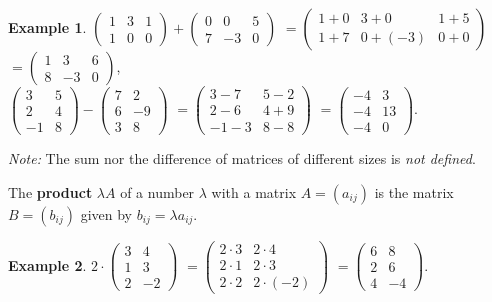 \documentclass[
  english,
  12pt,
  oneside]{book}
\theoremstyle{definition}
\theoremstyle{definition}
\newtheorem{example}{Example}[chapter]
\theoremstyle{definition}
\theoremstyle{definition}
\theoremstyle{remark}
\begin{document}
\begin{example}
\protect\hypertarget{exm:unnamed-chunk-43}{}\label{exm:unnamed-chunk-43}\(\begin{pmatrix}1 & 3 & 1\\ 1 & 0 & 0\end{pmatrix}+
\begin{pmatrix}0 & 0 & 5\\ 7 & -3 & 0\end{pmatrix}\)
\(=\begin{pmatrix}1+0&3+0&1+5\\1+7&0+(-3)&0+0\end{pmatrix}\)
\(=\begin{pmatrix}1&3&6\\8&-3&0\end{pmatrix}\),\\
\(\begin{pmatrix}3&5\\2&4\\-1&8\end{pmatrix}-\begin{pmatrix}7&2\\6&-9\\3&8\end{pmatrix}\)
\(=\begin{pmatrix}3-7&5-2\\2-6&4+9\\-1-3& 8-8\end{pmatrix}\)
\(=\begin{pmatrix}-4&3\\-4&13\\-4&0\end{pmatrix}\).
\end{example}

\emph{Note:} The sum nor the difference of matrices of different sizes is \emph{not defined}.

The \textbf{product} \(\lambda A\) of a number \(\lambda\) with a matrix \(A=(a_{ij})\) is the matrix \(B=(b_{ij})\) given by \(b_{ij}=\lambda a_{ij}\).

\begin{example}
\protect\hypertarget{exm:unnamed-chunk-44}{}\label{exm:unnamed-chunk-44}\(2\cdot \begin{pmatrix} 3 & 4\\ 1 & 3\\ 2 & -2\end{pmatrix}\)
\(=\begin{pmatrix}2\cdot3&2\cdot4\\ 2\cdot1&2\cdot 3\\2\cdot 2&2\cdot(-2)\end{pmatrix}\)
\(=\begin{pmatrix}6&8\\2&6\\4&-4\end{pmatrix}\).
\end{example}
\end{document}
